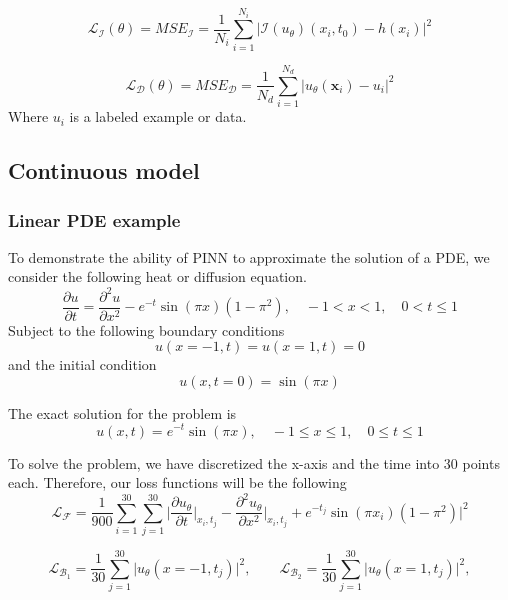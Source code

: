 \documentclass[a4paper, onecolumn, 12pt]{article}
\begin{document}
\begin{equation}
\mathcal{L}_{\mathcal{I}}(\theta) = MSE_{\mathcal{I}} 
= \frac{1}{N_i} \sum_{i=1}^{N_i} \bigg| \mathcal{I}(u_\theta)(x_i, t_0) - h(x_i) \bigg|^2
\end{equation}

\begin{equation}
\mathcal{L}_{\mathcal{D}}(\theta) = MSE_{\mathcal{D}} 
= \frac{1}{N_d} \sum_{i=1}^{N_d} \bigg| u_{\theta}(\mathbf{x}_i) - u_i \bigg|^2
\end{equation}
Where $u_i$ is a labeled example or data.

\subsection{Continuous model}
\subsubsection{Linear PDE example}
To demonstrate the ability of PINN to approximate the solution of a PDE, we 
consider the following heat or diffusion equation.
\begin{equation}
\frac{\partial u}{\partial t} = \frac{\partial^2 u}{\partial x^2}
- e^{-t} \sin{(\pi x)} (1 - \pi^2), \quad -1 < x < 1, \quad 0 < t \le 1
\end{equation} 
Subject to the following boundary conditions
\begin{equation}
    u(x=-1, t) = u(x=1, t) = 0
\end{equation}
and the initial condition
\begin{equation}
u(x, t=0) = \sin(\pi x)
\end{equation}

The exact solution for the problem is 
\begin{equation}
u(x, t) = e^{-t} \sin(\pi x), \quad -1 \le x \le 1, \quad 0 \le t \le 1
\end{equation}

To solve the problem, we have discretized the x-axis and the time into $30$ points each.
Therefore, our loss functions will be the following
$$
\mathcal{L}_{\mathcal{F}} = \frac{1}{900} \sum_{i=1}^{30} \sum_{j=1}^{30} 
\Bigg| 
\frac{\partial u_\theta}{\partial t}\bigg|_{x_i, t_j} - \frac{\partial^2 u_\theta}{\partial x^2}\bigg|_{x_i, t_j}
+ e^{-t_j} \sin{(\pi x_i)} (1 - \pi^2) 
\Bigg|^2
$$

$$
\mathcal{L}_{\mathcal{B}_1} = \frac{1}{30} \sum_{j=1}^{30} 
\Bigg| u_\theta(x=-1, t_j) \Bigg|^2, \qquad
\mathcal{L}_{\mathcal{B}_2} = \frac{1}{30} \sum_{j=1}^{30} 
\Bigg| u_\theta(x=1, t_j) \Bigg|^2,
$$
\end{document}
